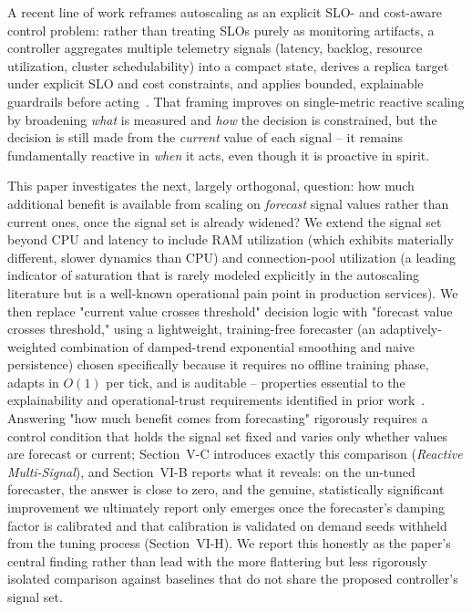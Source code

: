 \documentclass[conference]{IEEEtran}
\begin{document}
A recent line of work reframes autoscaling as an explicit SLO- and cost-aware control problem: rather
than treating SLOs purely as monitoring artifacts, a controller aggregates multiple telemetry signals
(latency, backlog, resource utilization, cluster schedulability) into a compact state, derives a
replica target under explicit SLO and cost constraints, and applies bounded, explainable guardrails
before acting~\cite{ref_base}. That framing improves on single-metric reactive scaling by broadening
\emph{what} is measured and \emph{how} the decision is constrained, but the decision is still made
from the \emph{current} value of each signal -- it remains fundamentally reactive in \emph{when} it
acts, even though it is proactive in spirit.

This paper investigates the next, largely orthogonal, question: how much additional benefit is
available from scaling on \emph{forecast} signal values rather than current ones, once the signal set
is already widened? We extend the signal set beyond CPU and latency to include RAM utilization
(which exhibits materially different, slower dynamics than CPU) and connection-pool utilization (a
leading indicator of saturation that is rarely modeled explicitly in the autoscaling literature but is
a well-known operational pain point in production services). We then replace "current value crosses
threshold" decision logic with "forecast value crosses threshold," using a lightweight,
training-free forecaster (an adaptively-weighted combination of damped-trend exponential smoothing and
naive persistence) chosen specifically because it requires no offline training phase, adapts in $O(1)$
per tick, and is auditable -- properties essential to the explainability and operational-trust
requirements identified in prior work~\cite{ref_base}. Answering "how much benefit comes from
forecasting" rigorously requires a control condition that holds the signal set fixed and varies only
whether values are forecast or current; Section~V-C introduces exactly this comparison
(\emph{Reactive Multi-Signal}), and Section~VI-B reports what it reveals: on the un-tuned forecaster,
the answer is close to zero, and the genuine, statistically significant improvement we ultimately
report only emerges once the forecaster's damping factor is calibrated and that calibration is
validated on demand seeds withheld from the tuning process (Section~VI-H). We report this honestly as
the paper's central finding rather than lead with the more flattering but less rigorously isolated
comparison against baselines that do not share the proposed controller's signal set.
\end{document}
